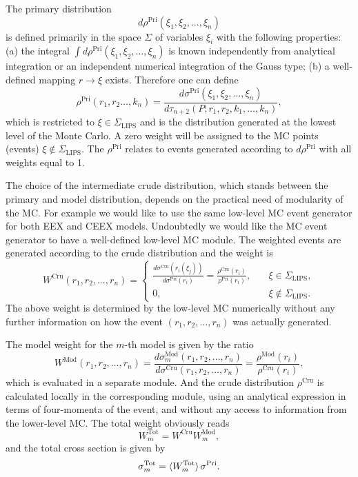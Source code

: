 The primary distribution
\begin{equation}
d\rho^\text{Pri}(\xi_1,\xi_2,\ldots,\xi_n)
\end{equation} 
is defined primarily in the space $\Sigma$ of variables $\xi_i$ with the following properties: (a) the integral $\int d\rho^\text{Pri}(\xi_1,\xi_2,\ldots,\xi_n)$ is known independently from analytical integration or an independent numerical integration of the Gauss type; (b) a well-defined mapping $r\to\xi$ exists. Therefore one can define
\begin{equation}
\rho^\text{Pri}(r_1,r_2\ldots,k_n)=\frac{d\sigma^\text{Pri}(\xi_1,\xi_2,\ldots,\xi_n)}{d\tau_{n+2}(P;r_1,r_2,k_1,\ldots,k_n)},
\end{equation}
which is restricted to $\xi\in\Sigma_\text{LIPS}$ and is the distribution generated at the lowest level of the Monte Carlo. A zero weight will be assigned to the MC points (events) $\xi\not\in\Sigma_\text{LIPS}$. The $\rho^\text{Pri}$ relates to events generated according to $d\rho^\text{Pri}$ with all weights equal to 1. 

The choice of the intermediate crude distribution, which stands between the primary and model distribution, depends on the practical need of modularity of the MC. For example we would like to use the same low-level MC event generator for both EEX and CEEX models. Undoubtedly we would like the MC event generator to have a well-defined low-level MC module. The weighted events are generated according to the crude distribution and the weight is
\begin{equation}
W^\text{Cru}(r_1,r_2,\ldots,r_n)=\begin{cases}
\frac{d\sigma^\text{Cru}(r_i(\xi_j))}{d\sigma^\text{Pri}(r_i)}=\frac{\rho^\text{Cru}(r_i)}{\rho^\text{Pri}(r_i)}, &\quad \xi\in\Sigma_\text{LIPS},\\
0, &\quad \xi\not\in\Sigma_\text{LIPS}.
\end{cases}
\end{equation}
The above weight is determined by the low-level MC numerically without any further information on how the event $(r_1,r_2,\ldots,r_n)$ was actually generated.

The model weight for the $m$-th model is given by the ratio
\begin{equation}
W^\text{Mod}(r_1,r_2,\ldots,r_n)=\frac{d\sigma^\text{Mod}_m(r_1,r_2,\ldots,r_n)}{d\sigma^\text{Cru}(r_1,r_2,\ldots,r_n)}=\frac{\rho^\text{Mod}(r_i)}{\rho^\text{Cru}(r_i)},
\end{equation}
which is evaluated in a separate module. And the crude distribution $\rho^\text{Cru}$ is calculated locally in the corresponding module, using an analytical expression in terms of four-momenta of the event, and without any access to information from the lower-level MC. The total weight obviously reads
\begin{equation}
W^\text{Tot}_m=W^\text{Cru}W^\text{Mod}_m,
\end{equation}
and the total cross section is given by
\begin{equation}
\sigma^\text{Tot}_m=\braket{W^\text{Tot}_m}\sigma^\text{Pri}.
\end{equation}

